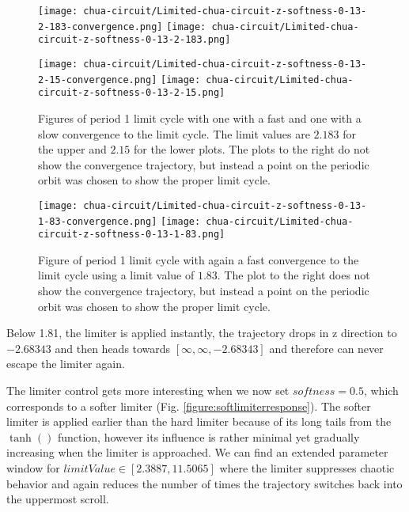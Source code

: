 \documentclass[main]{subfiles}
\begin{document}
\begin{figure}[H]
\centering
\texttt{[image: chua-circuit/Limited-chua-circuit-z-softness-0-13-2-183-convergence.png]}
\texttt{[image: chua-circuit/Limited-chua-circuit-z-softness-0-13-2-183.png]}

\texttt{[image: chua-circuit/Limited-chua-circuit-z-softness-0-13-2-15-convergence.png]}
\texttt{[image: chua-circuit/Limited-chua-circuit-z-softness-0-13-2-15.png]}
\caption[Figure of period 1 limit cycle]{Figures of period 1 limit cycle with one with a fast and one with a slow convergence to the limit cycle. The limit values are \(2.183\) for the upper and \(2.15\) for the lower plots. The plots to the right do not show the convergence trajectory, but instead a point on the periodic orbit was chosen to show the proper limit cycle.}
\label{figure:z-1-limit-cycle-ctrajectories}
\end{figure}

\begin{figure}[H]
\centering
\texttt{[image: chua-circuit/Limited-chua-circuit-z-softness-0-13-1-83-convergence.png]}
\texttt{[image: chua-circuit/Limited-chua-circuit-z-softness-0-13-1-83.png]}
\caption[Figure of another period 1 limit cycle]{Figure of period 1 limit cycle with again a fast convergence to the limit cycle using a limit value of \(1.83\). The plot to the right does not show the convergence trajectory, but instead a point on the periodic orbit was chosen to show the proper limit cycle.}
\label{figure:z-fast-1-limit-cycle-trajectory}
\end{figure}

Below 1.81, the limiter is applied instantly, the trajectory drops in z direction to \(-2.68343\) and then heads towards \([\infty,\infty,-2.68343]\) and therefore can never escape the limiter again.


The limiter control gets more interesting when we now set \(softness=0.5\), which corresponds to a softer limiter (Fig. \ref{figure:softlimiterresponse}). %
%
The softer limiter is applied earlier than the hard limiter because of its long tails from the \(\tanh()\) function, however its influence is rather minimal yet gradually increasing when the limiter is approached. %
%
We can find an extended parameter window for \(limitValue \in [2.3887,11.5065]\) where the limiter suppresses chaotic behavior and again reduces the number of times the trajectory switches back into the uppermost scroll.
\end{document}
